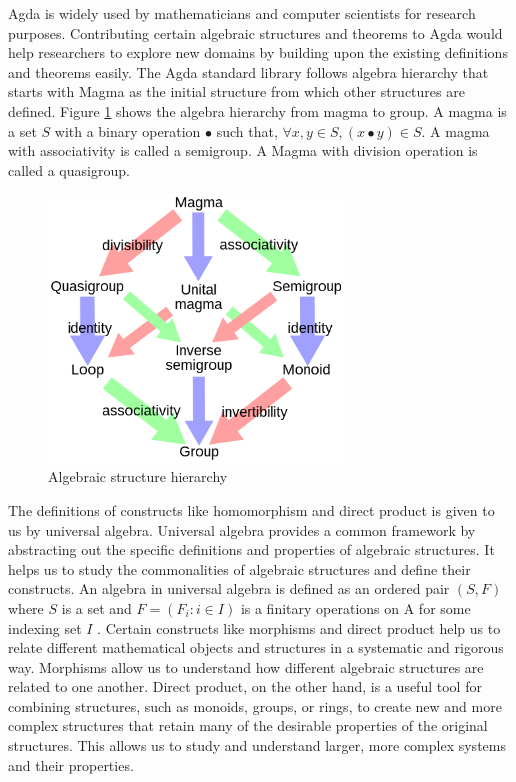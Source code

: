 Agda is widely used by mathematicians and computer scientists for research
purposes. Contributing certain algebraic structures and theorems to Agda would
help researchers to explore new domains by building upon the existing
definitions and theorems easily. The Agda standard library follows algebra
hierarchy that starts with Magma as the initial structure from which other
structures are defined. Figure \ref{fig_magma} shows the algebra hierarchy from
magma to group. A magma is a set $S$ with a binary operation $∙$ such that,
$\forall x,y \in S, (x ∙ y) \in S$. A magma with associativity is called a
semigroup. A Magma with division operation is called a quasigroup.
\begin{figure}[ht]
	\centering
	\includegraphics[width=0.7\textwidth]{figures/Sample/Magma_to_group.jpg}
	\caption{Algebraic structure hierarchy \cite{enwiki:1107380309}}
	\label{fig_magma}
 \end{figure}
The definitions of constructs like homomorphism and direct product is given to
us by universal algebra. Universal algebra provides a common framework by
abstracting out the specific definitions and properties of algebraic structures.
It helps us to study the commonalities of algebraic structures and define their
constructs. An algebra in universal algebra is defined as an ordered pair
$(S,F)$ where $S$ is a set and $F = (F_i:i\in I)$ is a finitary operations on A
for some indexing set $I$ \cite{sannella2012foundations}. Certain constructs
like morphisms and direct product help us to relate different mathematical
objects and structures in a systematic and rigorous way. Morphisms
allow us to understand how different algebraic structures are related to one
another. Direct product, on the other hand, is a useful tool for combining
structures, such as monoids, groups, or rings, to create new and more
complex structures that retain many of the desirable properties of the original
structures. This allows us to study and understand larger, more complex systems
and their properties.

